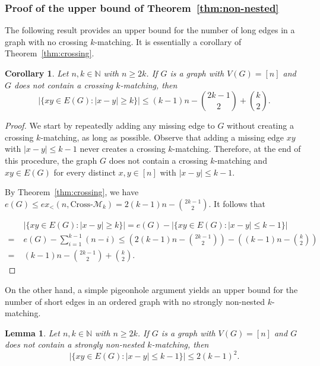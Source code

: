 \documentclass[11pt]{article}
\newtheorem{lemma}[theorem]{Lemma}
\newtheorem{corollary}[theorem]{Corollary}
\theoremstyle{definition}
\begin{document}
\subsubsection{Proof of the upper bound of Theorem~\ref{thm:non-nested}}

The following result provides an upper bound for the number of long edges in a graph with no crossing $k$-matching.
It is essentially a corollary of Theorem~\ref{thm:crossing}.

\begin{corollary}\label{col:crossing}
    Let $n,k\in\mathbb N$ with $n\ge2k$.
    If $G$ is a graph with $V(G)=[n]$ and $G$ does not contain a crossing $k$-matching, then
    $$|\{xy\in E(G):|x-y|\ge k\}|\le(k-1)n-\binom{2k-1}{2}+\binom{k}{2}.$$
\end{corollary}

\begin{proof}
    We start by repeatedly adding any missing edge to $G$ without creating a crossing $k$-matching, as long as possible.
    Observe that adding a missing edge $xy$ with $|x-y|\le k-1$ never creates a crossing $k$-matching.
    Therefore, at the end of this procedure, the graph $G$ does not contain a crossing $k$-matching and $xy\in E(G)$ for every distinct $x,y\in[n]$ with $|x-y|\le k-1$.
        
    By Theorem~\ref{thm:crossing}, we have $e(G)\le ex_<(n,\text{Cross-}\mathcal M_k)=2(k-1)n-\binom{2k-1}{2}$.
    It follows that

    \begin{align*}
    & |\{xy\in E(G):|x-y|\ge k\}|=e(G)-|\{xy\in E(G):|x-y|\le k-1\}|\\
    =\; & e(G)-\sum_{i=1}^{k-1}(n-i)\le\left(2(k-1)n-\binom{2k-1}{2}\right)-\left((k-1)n-\binom{k}{2}\right)\\
    =\; & (k-1)n-\binom{2k-1}{2}+\binom{k}{2}.
    \end{align*}
\end{proof}

On the other hand, a simple pigeonhole argument yields an upper bound for the number of short edges in an ordered graph with no strongly non-nested $k$-matching.

\begin{lemma}\label{lem:non-nested}
    Let $n,k\in\mathbb N$ with $n\ge2k$.
    If $G$ is a graph with $V(G)=[n]$ and $G$ does not contain a strongly non-nested $k$-matching, then
    $$|\{xy\in E(G):|x-y|\le k-1\}|\le2(k-1)^2.$$
\end{lemma}
\end{document}
